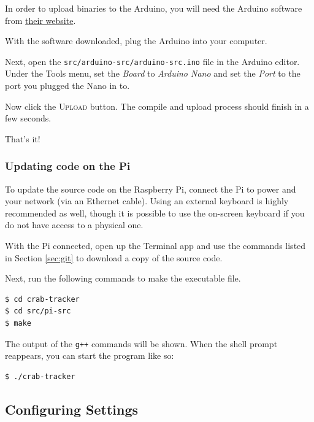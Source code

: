 \documentclass[12pt]{article}
\begin{document}
In order to upload binaries to the Arduino, you will need the Arduino software
from \href{https://www.arduino.cc/en/Main/Software}{their website}.

With the software downloaded, plug the Arduino into your computer.

Next, open the
\texttt{src/arduino-src/arduino-src.ino} file in the Arduino
editor.
Under the Tools menu, set the \textsl{Board} to \textit{Arduino Nano}
and set the \textsl{Port} to the port you plugged the Nano in to.

Now click the \textsc{Upload} button.
The compile and upload process should finish in a few seconds.

That's it!

\subsubsection{Updating code on the Pi}

To update the source code on the Raspberry Pi, connect the Pi to power and
your network (via an Ethernet cable).
Using an external keyboard is highly recommended as well, though it is possible
to use the on-screen keyboard if you do not have access to a physical one.

With the Pi connected, open up the Terminal app and use the commands listed
in Section \ref{sec:git} to download a copy of the source code.

Next, run the following commands to make the executable file.

\begin{lstlisting}[language=bash]
$ cd crab-tracker
$ cd src/pi-src
$ make
\end{lstlisting}

The output of the \texttt{g++} commands will be shown.
When the shell prompt reappears, you can start the program like so:

\begin{lstlisting}[language=bash]
$ ./crab-tracker
\end{lstlisting}

\subsection{Configuring Settings}
\end{document}
